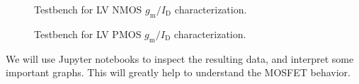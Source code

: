 \documentclass[
  a4paper,
  DIV=11,
  numbers=noendperiod]{scrartcl}
\begin{document}
\begin{figure}


\caption{\label{fig-techsweep-nmos-tb}Testbench for LV NMOS
\(g_\mathrm{m}/I_\mathrm{D}\) characterization.}

\end{figure}%

\begin{figure}


\caption{\label{fig-techsweep-pmos-tb}Testbench for LV PMOS
\(g_\mathrm{m}/I_\mathrm{D}\) characterization.}

\end{figure}%

We will use Jupyter notebooks to inspect the resulting data, and
interpret some important graphs. This will greatly help to understand
the MOSFET behavior.
\end{document}
